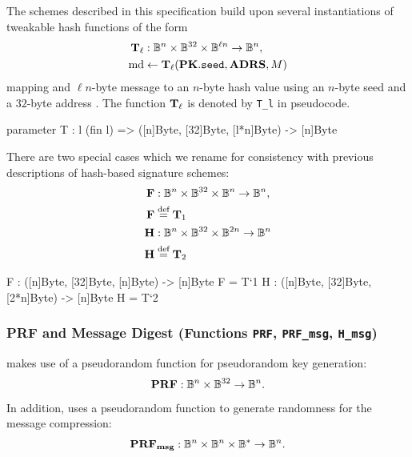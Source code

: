    The schemes described in this specification build upon several instantiations 
   of tweakable hash functions of the form 
   \begin{align*}
     \mathbf{T}_\ell &: \mathbb{B}^n \times \mathbb{B}^{32} \times \mathbb{B}^{\ell n} \to \mathbb{B}^n, \\
     \textrm{md} &\leftarrow \mathbf{T}_\ell(\mathbf{PK}.\texttt{seed}, \textbf{ADRS}, M) 
   \end{align*}
   mapping and $\ell n$-byte message \msg to an
   $n$-byte hash value \md using an $n$-byte seed \pseed and a $32$-byte address \adrs.
   The function $\mathbf{T}_\ell$ is denoted by \texttt{T\_l} in pseudocode.

\begin{code}
  parameter
    T : {l} (fin l) => ([n]Byte, [32]Byte, [l*n]Byte) -> [n]Byte
\end{code}

   There are two special cases which we rename for consistency with previous 
   descriptions of hash-based signature schemes:
   \begin{align*}
     \mathbf{F} &: \mathbb{B}^n \times \mathbb{B}^{32} \times \mathbb{B}^n \to \mathbb{B}^n, \\
     \mathbf{F} &\stackrel{\text{def}}{=} \mathbf{T}_1\\
     \mathbf{H} &: \mathbb{B}^n \times \mathbb{B}^{32} \times \mathbb{B}^{2n} \to \mathbb{B}^n \\
     \mathbf{H} &\stackrel{\text{def}}{=} \mathbf{T}_2\\
   \end{align*}

\begin{code}
  F : ([n]Byte, [32]Byte, [n]Byte) -> [n]Byte
  F = T`{1}
  H : ([n]Byte, [32]Byte, [2*n]Byte) -> [n]Byte
  H = T`{2}
\end{code}
   
   
\subsubsection{PRF and Message Digest (Functions \texttt{PRF}, \texttt{PRF\_msg}, \texttt{H\_msg})}   
   \spx makes use of a pseudorandom function \sphincsPRF for pseudorandom key
   generation: 
   \begin{equation*}
      \mathbf{PRF}: \mathbb{B}^n \times \mathbb{B}^{32} \to \mathbb{B}^n.
   \end{equation*}
   In addition, \spx uses a pseudorandom function \sphincsPRFmsg to generate 
   randomness for the message compression:
   \begin{equation*}
      \mathbf{PRF_{msg}}: \mathbb{B}^n \times \mathbb{B}^n \times \mathbb{B}^* \to \mathbb{B}^n.
   \end{equation*}
   
